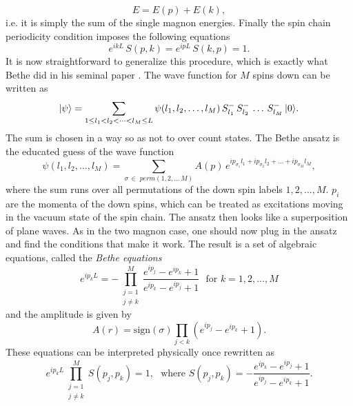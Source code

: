 \begin{equation}
	E = E(p) + E(k),
\end{equation}
i.e. it is simply the sum of the single magnon energies. Finally the spin chain periodicity condition imposes the following equations
\begin{equation}
	e^{ikL} \, S(p,k) = e^{ipL} \, S(k, p) = 1.
\end{equation}
It is now straightforward to generalize this procedure, which is exactly what Bethe did in his seminal paper \cite{bethe_original}. The wave function for $M$ spins down can be written as
\begin{equation}
	|\psi\rangle = \sum_{1 \leq l_1 < l_2 < \dots < l_M \leq L} \psi(l_1, l_2, \dots, l_M) \, S^-_{l_1} \, S^-_{l_2} \, \dots \, S^-_{l_M} \, |0\rangle.
\end{equation}
The sum is chosen in a way so as not to over count states. The Bethe ansatz is the educated guess of the wave function
\begin{equation}
	\psi(l_1, l_2, \dots, l_M) = \sum_{\sigma \, \in \; perm(1,2,\dots\,M)} A(p) \, e^{ip_{\sigma_1} l_1 + ip_{\sigma_2} l_2 + \dots + ip_{\sigma_M} l_M}, 
\end{equation}
where the sum runs over all permutations of the down spin labels $1, 2, \dots, M$. $p_i$ are the momenta of the down spins, which can be treated as excitations moving in the vacuum state of the spin chain. The ansatz then looks like a superposition of plane waves. As in the two magnon case, one should now plug in the ansatz and find the conditions that make it work. The result is a set of algebraic equations, called the \emph{Bethe equations} \cite{staudacher}
\begin{equation}
	e^{ip_k L} = - \prod_{\substack{j=1 \\ j \neq k}}^M \frac{e^{ip_j} - e^{ip_k} + 1}{e^{ip_k} - e^{ip_j} + 1} \,\,\,\, \mathrm{for} \,\, k = 1,2, \dots, M
	\label{eq:bethe_coordinate}
\end{equation}
and the amplitude is given by
\begin{equation}
	A(r) = \mathrm{sign}(\sigma) \prod_{j<k} \left( e^{ip_j} - e^{ip_k} + 1 \right).
\end{equation}
These equations can be interpreted physically once rewritten as
\begin{equation}
	e^{ip_k L} \prod_{\substack{j=1 \\ j \neq k}}^M S(p_j, p_k) = 1, \,\,\,\, \mathrm{where} \,\, S(p_j, p_k) = -\frac{e^{ip_k} - e^{ip_j} + 1}{e^{ip_j} - e^{ip_k} + 1}.
	\label{eq:CBA}
\end{equation}

